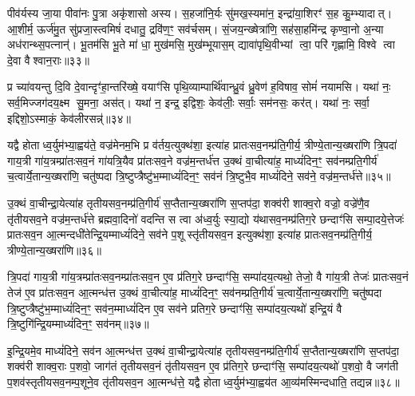 पीव॑र्यस्य जा॒या पीवा॑नः पु॒त्रा अकृ॑शासो अस्य। स॒हजा॑नि॒र्यः सु॑मख॒स्यमा॑न॒ इन्द्रा॑या॒शिरꣳ॑ स॒ह कु॒म्भ्यादात्। आ॒शीर्म॒ ऊर्ज॑मु॒त सु॑प्रजा॒स्त्वमिषं॑ दधातु॒ द्रवि॑ण॒ꣳ॒ सव॑र्चसम्। सं॒जय॒न्ख्षेत्रा॑णि॒ सह॑सा॒हमि॑न्द्र कृण्वा॒नो अ॒न्या अध॑रान्थ्स॒पत्नान्॑। भू॒तम॑सि भू॒ते मा॑ धा॒ मुख॑मसि॒ मुख॑म्भूयास॒म् द्यावा॑पृथि॒वीभ्यां त्वा॒ परि॑ गृह्णामि॒ विश्वे त्वा दे॒वा वैश्वान॒राः॥३३॥

प्र च्या॑वयन्तु दि॒वि दे॒वान्दृꣳ॑हा॒न्तरि॑ख्षे॒ वयाꣳ॑सि पृथि॒व्याम्पार्थि॑वान्ध्रु॒वं ध्रु॒वेण॑ ह॒विषाव॒ सोमं॑ नयामसि। यथा॑ नः॒ सर्व॒मिज्जग॑दय॒क्ष्म सु॒मना॒ अस॑त्। यथा॑ न॒ इन्द्र॒ इद्विशः॒ केव॑लीः॒ सर्वाः॒ सम॑नसः॒ कर॑त्। यथा॑ नः॒ सर्वा॒ इद्दिशो॒ऽस्माकं॒ केव॑लीरसन्न्॑॥३४॥

{\anuvakamend[{एन॑सा विश्वकर्म॒न् यो दख्षि॑णां॒ न स॑र्पिर्ग्री॒वी वैश्वान॒राश्च॑त्वारि॒ꣳ॒शच्च॑॥८॥}]}

यद्वै होताध्व॒र्युम॑भ्या॒ह्वय॑ते॒ वज्र॑मेनम॒भि प्र व॑र्तय॒त्युक्थ॑शा॒ इत्या॑ह प्रातःसव॒नम्प्र॑ति॒गीर्य॒ त्रीण्ये॒तान्य॒ख्षरा॑णि त्रि॒पदा॑ गाय॒त्री गा॑य॒त्रम्प्रा॑तःसव॒नं गा॑यत्रि॒यैव प्रा॑तःसव॒ने वज्र॑म॒न्तर्ध॑त्त उ॒क्थं वा॒चीत्या॑ह॒ माध्यं॑दिन॒ꣳ॒ सव॑नम्प्रति॒गीर्य॑ च॒त्वार्ये॒तान्य॒ख्षरा॑णि॒ चतु॑ष्पदा त्रि॒ष्टुप्त्रैष्टु॑भ॒म्माध्यं॑दिन॒ꣳ॒ सव॑नं त्रि॒ष्टुभै॒व माध्यं॑दिने॒ सव॑ने॒ वज्र॑म॒न्तर्ध॑त्ते॥३५॥

उ॒क्थं वा॒चीन्द्रा॒येत्या॑ह तृतीयसव॒नम्प्र॑ति॒गीर्य॑ स॒प्तैतान्य॒ख्षरा॑णि स॒प्तप॑दा॒ शक्व॑री शाक्व॒रो वज्रो॒ वज्रे॑णै॒व तृ॑तीयसव॒ने वज्र॑म॒न्तर्ध॑त्ते ब्रह्मवा॒दिनो॑ वदन्ति स त्वा अ॑ध्व॒र्युः स्या॒द्यो य॑थासव॒नम्प्र॑तिग॒रे छन्दाꣳ॑सि सम्पा॒दये॒त्तेजः॑ प्रातःसव॒न आ॒त्मन्दधी॑तेन्द्रि॒यम्माध्यं॑दिने॒ सव॑ने प॒शूस्तृ॑तीयसव॒न इत्युक्थ॑शा॒ इत्या॑ह प्रातःसव॒नम्प्र॑ति॒गीर्य॒ त्रीण्ये॒तान्य॒ख्षरा॑णि॥३६॥

त्रि॒पदा॑ गाय॒त्री गा॑य॒त्रम्प्रा॑तःसव॒नम्प्रा॑तःसव॒न ए॒व प्र॑तिग॒रे छन्दाꣳ॑सि॒ सम्पा॑दय॒त्यथो॒ तेजो॒ वै गा॑य॒त्री तेजः॑ प्रातःसव॒नं तेज॑ ए॒व प्रा॑तःसव॒न आ॒त्मन्ध॑त्त उ॒क्थं वा॒चीत्या॑ह॒ माध्यं॑दिन॒ꣳ॒ सव॑नम्प्रति॒गीर्य॑ च॒त्वार्ये॒तान्य॒ख्षरा॑णि॒ चतु॑ष्पदा त्रि॒ष्टुप्त्रैष्टु॑भ॒म्माध्यं॑दिन॒ꣳ॒ सव॑न॒म्माध्यं॑दिन ए॒व सव॑ने प्रतिग॒रे छन्दाꣳ॑सि॒ सम्पा॑दय॒त्यथो॑ इन्द्रि॒यं वै त्रि॒ष्टुगि॑न्द्रि॒यम्माध्यं॑दिन॒ꣳ॒ सव॑नम्॥३७॥

इ॒न्द्रि॒यमे॒व माध्यं॑दिने॒ सव॑न आ॒त्मन्ध॑त्त उ॒क्थं वा॒चीन्द्रा॒येत्या॑ह तृतीयसव॒नम्प्र॑ति॒गीर्य॑ स॒प्तैतान्य॒ख्षरा॑णि स॒प्तप॑दा॒ शक्व॑री शाक्व॒राः प॒शवो॒ जाग॑तं तृतीयसव॒नं तृ॑तीयसव॒न ए॒व प्र॑तिग॒रे छन्दाꣳ॑सि॒ सम्पा॑दय॒त्यथो॑ प॒शवो॒ वै जग॑ती प॒शव॑स्तृतीयसव॒नम्प॒शूने॒व तृ॑तीयसव॒न आ॒त्मन्ध॑त्ते॒ यद्वै होताध्व॒र्युम॑भ्या॒ह्वय॑त आ॒व्य॑मस्मिन्दधाति॒ तद्यन्न॥३८॥

